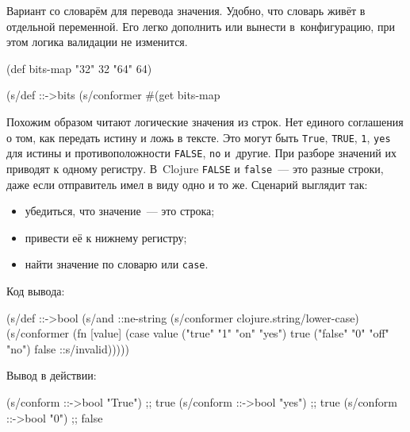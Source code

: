 
Вариант со словарём для перевода значения. Удобно, что словарь живёт в
отдельной переменной. Его легко дополнить или вынести в~конфигурацию, при этом
логика валидации не изменится.

\begin{english}
  \begin{clojure}
(def bits-map {"32" 32 "64" 64})

(s/def ::->bits
  (s/conformer
   #(get bits-map %
  \end{clojure}
\end{english}

Похожим образом читают логические значения из строк. Нет единого соглашения о
том, как передать истину и ложь в тексте. Это могут быть \verb|True|,
\verb|TRUE|, \verb|1|, \verb|yes| для истины и противоположности
\verb|FALSE|, \verb|no| и~другие. При разборе значений их приводят к одному
регистру. В~Clojure \verb|FALSE| и \verb|false|~--- это разные строки, даже если
отправитель имел в виду одно и то же. Сценарий выглядит так:

\begin{itemize}

\item
  убедиться, что значение~--- это строка;

\item
  привести её к нижнему регистру;

\item
  найти значение по словарю или \verb|case|.

\end{itemize}

\noindent
Код вывода:

\begin{english}
  \begin{clojure}
(s/def ::->bool
  (s/and
   ::ne-string
   (s/conformer clojure.string/lower-case)
   (s/conformer
    (fn [value]
      (case value
        ("true" "1" "on" "yes") true
        ("false" "0" "off" "no") false
        ::s/invalid)))))

  \end{clojure}
\end{english}

\noindent
Вывод в действии:

\begin{english}
  \begin{clojure}
(s/conform ::->bool "True") ;; true
(s/conform ::->bool "yes")  ;; true
(s/conform ::->bool "0")    ;; false
  \end{clojure}
\end{english}

